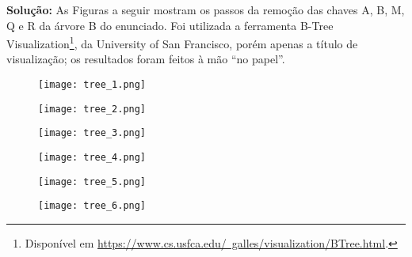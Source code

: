 \textbf{Solução:}
As Figuras a seguir mostram os passos da remoção das chaves A, B, M, Q e R da árvore B do enunciado. Foi utilizada a ferramenta B-Tree Visualization\footnote{Disponível em \href{https://www.cs.usfca.edu/~galles/visualization/BTree.html}{https://www.cs.usfca.edu/~galles/visualization/BTree.html}.}, da University of San Francisco, porém apenas a título de visualização; os resultados foram feitos à mão ``no papel''.

\begin{figure}[H]
    \centering
    \texttt{[image: tree\_1.png]}
\end{figure}

\begin{figure}[H]
    \centering
    \texttt{[image: tree\_2.png]}
\end{figure}

\begin{figure}[H]
    \centering
    \texttt{[image: tree\_3.png]}
\end{figure}

\begin{figure}[H]
    \centering
    \texttt{[image: tree\_4.png]}
\end{figure}

\begin{figure}[H]
    \centering
    \texttt{[image: tree\_5.png]}
\end{figure}

\begin{figure}[H]
    \centering
    \texttt{[image: tree\_6.png]}
\end{figure}
